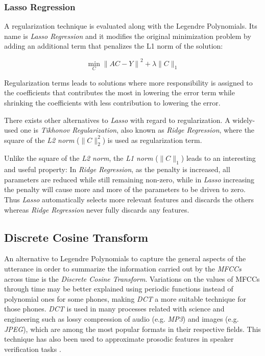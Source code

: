 \subsubsection{Lasso Regression}

A regularization technique is evaluated along with the Legendre Polynomials. Its name is
\textit{Lasso Regression} and it modifies the
original minimization problem by adding an additional term that penalizes the L1 norm of the
solution:

\begin{equation}
  \min_{C} {\| AC - Y \|}^{2} + \lambda \| C \|_{1}
\end{equation}

Regularization terms leads to solutions where more responsibility is assigned to the
coefficients that contributes the most in lowering the error term while
shrinking the coefficients with less contribution to lowering the error.

There exists other alternatives to \textit{Lasso} with regard to regularization.
A widely-used one is \textit{Tikhonov Regularization}, also known as \textit{Ridge Regression},
where the square of the \textit{L2 norm} ($\| C \|_{2}^{2}$) is used as regularization term.

Unlike the square of the \textit{L2 norm},
the \textit{L1 norm} ($\| C \|_{1}$)
leads to an interesting and useful property:
In \textit{Ridge Regression}, as the penalty is increased, all parameters are reduced while
still remaining non-zero, while in \textit{Lasso} increasing the penalty will cause more and
more of the parameters to be driven to zero. Thus \textit{Lasso} automatically selects more
relevant features and discards the others whereas \textit{Ridge Regression} never fully
discards any features.


\subsection{Discrete Cosine Transform}

An alternative to Legendre Polynomials to capture the general aspects of the utterance in order to
summarize the information carried out by the \textit{MFCCs} across time is the
\textit{Discrete Cosine Transform}. Variations on the values of MFCCs through time may be
better explained
using periodic functions instead of polynomial ones for some phones,
making \textit{DCT} a more suitable technique
for those phones. \textit{DCT} is used in many processes related with science and engineering
such as lossy compression of audio (e.g. \textit{MP3}) and images (e.g. \textit{JPEG}), which are
among the most popular formats in their respective fields. This technique has also been used
to approximate prosodic features in speaker verification tasks \cite{dct}.

